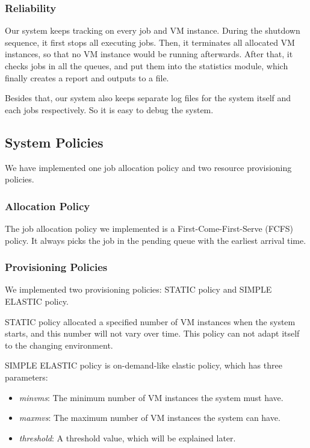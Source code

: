 \subsubsection{Reliability}
Our system keeps tracking on every job and VM instance. During the shutdown sequence, it first stops all executing jobs. Then, it terminates all allocated VM instances, so that no VM instance would be running afterwards. After that, it checks jobs in all the queues, and put them into the statistics module, which finally creates a report and outputs to a file.

Besides that, our system also keeps separate log files for the system itself and each jobs respectively. So it is easy to debug the system.


\subsection{System Policies}
We have implemented one job allocation policy and two resource provisioning policies.

\subsubsection{Allocation Policy}
The job allocation policy we implemented is a First-Come-First-Serve (FCFS) policy. It always picks the job in the pending queue with the earliest arrival time.

\subsubsection{Provisioning Policies}
We implemented two provisioning policies: STATIC policy and SIMPLE ELASTIC policy.

STATIC policy allocated a specified number of VM instances when the system starts, and this number will not vary over time. This policy can not adapt itself to the changing environment.

SIMPLE ELASTIC policy is on-demand-like elastic policy, which has three parameters:

\begin{itemize}
\item \emph{minvms}: The minimum number of VM instances the system must have.
\item \emph{maxmvs}: The maximum number of VM instances the system can have.
\item \emph{threshold}: A threshold value, which will be explained later.
\end{itemize}

